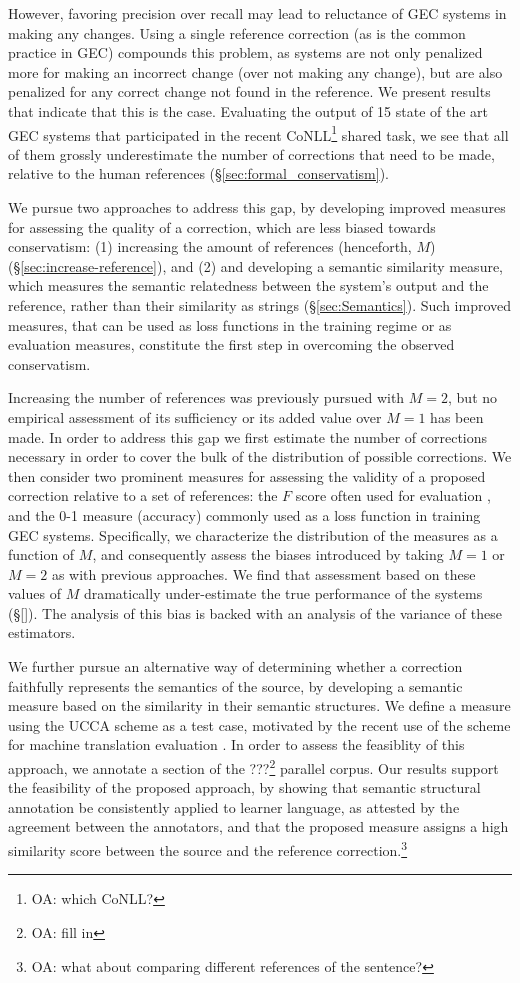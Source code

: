 \documentclass[english]{article}
\newcommand{\oa}[1]{\footnote{\color{red}OA: #1}}
\begin{document}
However, favoring precision over recall may lead to reluctance of GEC systems in making any
changes. Using a single reference correction (as is the common practice in GEC) compounds
this problem, as systems are not only penalized more for making an incorrect change (over not making
any change), but are also penalized for any correct change not found in the reference.
We present results that indicate that this is the case. Evaluating the output of 15 state of the art
GEC systems that participated in the recent CoNLL\oa{which CoNLL?} shared task, we see that all of them
grossly underestimate the number of corrections that need to be made, relative to the human references
(\S\ref{sec:formal_conservatism}). 

We pursue two approaches to address this gap, by developing improved measures for assessing 
the quality of a correction, which are less biased towards conservatism:
(1) increasing the amount of references (henceforth, $M$) (\S\ref{sec:increase-reference}),
and (2) and developing a semantic similarity measure, which measures the semantic relatedness
between the system's output and the reference, rather than their similarity
as strings (\S\ref{sec:Semantics}). Such improved measures, that can be used as
loss functions in the training regime or as evaluation measures,
constitute the first step in overcoming the observed conservatism.

Increasing the number of references was previously pursued with $M=2$,
but no empirical assessment of its sufficiency or its added value over $M=1$ has been made.
In order to address this gap we first estimate the number of corrections necessary in order
to cover the bulk of the distribution of possible corrections.
We then consider two prominent measures for assessing the validity of a proposed correction
relative to a set of references: the $F$ score often used for evaluation \cite{},
and the 0-1 measure (accuracy) commonly used as a loss function in training GEC systems.
Specifically, we characterize the distribution of the measures
as a function of $M$, and consequently assess the biases introduced by taking $M=1$ or $M=2$
as with previous approaches. 
We find that assessment based on these values of $M$ dramatically under-estimate the
true performance of the systems (\S\ref{}). 
The analysis of this bias is backed with an analysis of the variance of these estimators.

We further pursue an alternative way of determining whether a correction faithfully
represents the semantics of the source, by developing a semantic measure based on the similarity
in their semantic structures. We define a measure using the UCCA scheme \cite{abend2013universal} as a
test case, motivated by the recent use of the scheme for machine translation evaluation \cite{birch2016hume}.
In order to assess the feasiblity of this approach, we annotate a section of the ???\oa{fill in}
parallel corpus. Our results support the feasibility of the proposed approach,
by showing that semantic structural annotation be consistently applied
to learner language, as attested by the agreement between the annotators,
and that the proposed measure assigns a high similarity score between the source and the reference
correction.\oa{what about comparing different references of the sentence?}
\end{document}
